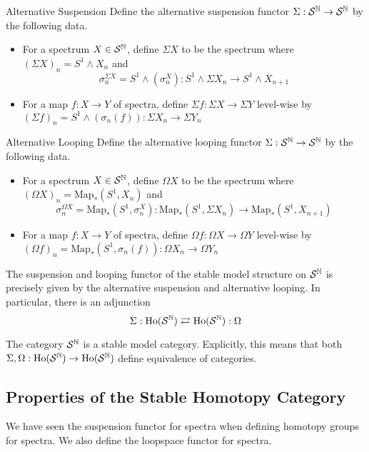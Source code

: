 \documentclass[a4paper]{article}
\begin{document}
\begin{defn}{Alternative Suspension}{} Define the alternative suspension functor $\Sigma:\mathcal{S}^{\mathbb{N}}\to\mathcal{S}^{\mathbb{N}}$ by the following data. 
\begin{itemize}
\item For a spectrum $X\in\mathcal{S}^{\mathbb{N}}$, define $\Sigma X$ to be the spectrum where $(\Sigma X)_n=S^1\wedge X_n$ and $$\sigma_n^{\Sigma X}=S^1\wedge(\sigma_n^X):S^1\wedge\Sigma X_n\to S^1\wedge X_{n+1}$$
\item For a map $f:X\to Y$ of spectra, define $\Sigma f:\Sigma X\to\Sigma Y$ level-wise by $(\Sigma f)_n=S^1\wedge(\sigma_n(f)):\Sigma X_n\to\Sigma Y_n$
\end{itemize}
\end{defn}

\begin{defn}{Alternative Looping}{} Define the alternative looping functor $\Sigma:\mathcal{S}^{\mathbb{N}}\to\mathcal{S}^{\mathbb{N}}$ by the following data. 
\begin{itemize}
\item For a spectrum $X\in\mathcal{S}^{\mathbb{N}}$, define $\Omega X$ to be the spectrum where $(\Omega X)_n=\text{Map}_\ast(S^1,X_n)$ and $$\sigma_n^{\Omega X}=\text{Map}_\ast(S^1,\sigma_n^X):\text{Map}_\ast(S^1,\Sigma X_n)\to\text{Map}_\ast(S^1,X_{n+1})$$
\item For a map $f:X\to Y$ of spectra, define $\Omega f:\Omega X\to\Omega Y$ level-wise by $(\Omega f)_n=\text{Map}_\ast(S^1,\sigma_n(f)):\Omega X_n\to\Omega Y_n$
\end{itemize}
\end{defn}

\begin{thm}{}{} The suspension and looping functor of the stable model structure on $\mathcal{S}^{\mathbb{N}}$ is precisely given by the alternative suspension and alternative looping. In particular, there is an adjunction $$\Sigma:\text{Ho}(\mathcal{S}^{\mathbb{N}})\rightleftarrows\text{Ho}(\mathcal{S}^{\mathbb{N}}):\Omega$$
\end{thm}

\begin{thm}{}{} The category $\mathcal{S}^{\mathbb{N}}$ is a stable model category. Explicitly, this means that both $\Sigma,\Omega:\text{Ho}(\mathcal{S}^{\mathbb{N}})\to\text{Ho}(\mathcal{S}^{\mathbb{N}})$ define equivalence of categories. 
\end{thm}

\subsection{Properties of the Stable Homotopy Category}
We have seen the suspension functor for spectra when defining homotopy groups for spectra. We also define the loopspace functor for spectra. 
\end{document}
